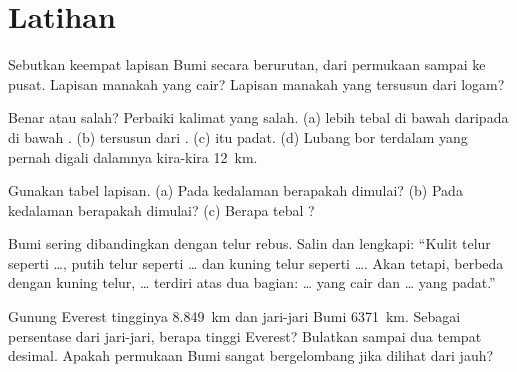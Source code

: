 \section{Latihan}

\begin{exercise}[$\star$]\label{exo:g6:inside-the-earth:1}
Sebutkan keempat lapisan Bumi secara berurutan, dari permukaan sampai ke
pusat. Lapisan manakah yang cair? Lapisan manakah yang tersusun dari logam?
\end{exercise}

\begin{exercise}[$\star$]\label{exo:g6:inside-the-earth:2}
Benar atau salah? Perbaiki kalimat yang salah.
(a)  lebih tebal di bawah  daripada di bawah .
(b)  tersusun dari .
(c)  itu padat.
(d) Lubang bor terdalam yang pernah digali dalamnya kira-kira 12~km.
\end{exercise}

\begin{exercise}[$\star$]\label{exo:g6:inside-the-earth:3}
Gunakan tabel lapisan. (a) Pada kedalaman berapakah  dimulai? (b) Pada
kedalaman berapakah  dimulai? (c) Berapa tebal ?
\end{exercise}

\begin{exercise}[$\star$]\label{exo:g6:inside-the-earth:4}
Bumi sering dibandingkan dengan telur rebus. Salin dan lengkapi: ``Kulit
telur seperti \ldots, putih telur seperti \ldots{} dan kuning telur seperti
\ldots{}. Akan tetapi, berbeda dengan kuning telur, \ldots{} terdiri atas
dua bagian: \ldots{} yang cair dan \ldots{} yang padat.''
\end{exercise}

\begin{exercise}[$\star\star$]\label{exo:g6:inside-the-earth:5}
Gunung Everest tingginya 8.849~km dan jari-jari Bumi 6371~km. Sebagai
persentase dari jari-jari, berapa tinggi Everest? Bulatkan sampai dua
tempat desimal. Apakah permukaan Bumi sangat bergelombang
jika dilihat dari jauh?
\end{exercise}

